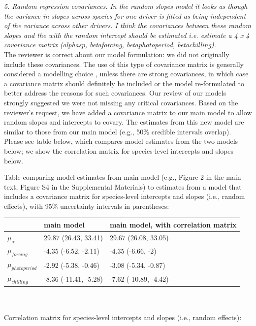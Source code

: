 \documentclass{article}
\begin{document}
\emph{5. Random regression covariances. In the random slopes model it looks as though the variance in
slopes across species for one driver is fitted as being independent of the variance across other
drivers. I think the covariances between these random slopes and the with the random
intercept should be estimated i.e. estimate a 4 x 4 covariance matrix (alphasp, betaforcing,
betaphotoperiod, betachilling).}\\

The reviewer is correct about our model formulation: we did not originally include these covariances. The use of this type of covariance matrix is generally considered a modelling choice \citep{gelman2006}, unless there are strong covariances, in which case a covariance matrix should definitely be included or the model re-formulated to better address the reasons for such covariances.  Our review of our models strongly suggested we were not missing any critical covariances. Based on the reviewer's request, we have added a covariance matrix to our main model to allow random slopes and intercepts to covary. The estimates from this new model are similar to those from our main model (e.g., 50\% credible intervals overlap). Please see table below, which compares model estimates from the two models below; we show the correlation matrix for species-level intercepts and slopes below. 

Table comparing model estimates from main model (e.g., Figure 2 in the main text, Figure S4 in the Supplemental Materials) to estimates from a model that includes a covariance matrix for species-level intercepts and slopes (i.e., random effects), with 95\% uncertainty intervals in parentheses:

\begingroup\footnotesize
\begin{tabular}{|p{}|p{}|p{}|}
  \hline
 & main model & main model, with correlation matrix \\ 
  \hline
$\mu_{\alpha}$ & 29.87 (26.43, 33.41) & 29.67 (26.08, 33.05) \\ 
  $\mu_{forcing}$ & -4.35 (-6.52, -2.11) & -4.35 (-6.66, -2) \\ 
  $\mu_{photoperiod}$ & -2.92 (-5.38, -0.46) & -3.08 (-5.34, -0.87) \\ 
  $\mu_{chilling}$ & -8.36 (-11.41, -5.28) & -7.62 (-10.89, -4.42) \\ 
   \hline
\end{tabular}
\endgroup
\\ 
\\Correlation matrix for species-level intercepts and slopes (i.e., random effects):
\end{document}

